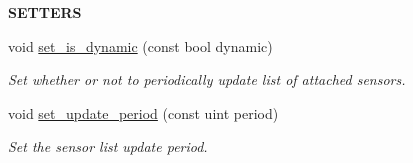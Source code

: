 \begin{Indent}{\bf S\+E\+T\+T\+E\+RS}\par
\begin{DoxyCompactItemize}
\item 
void \hyperlink{class_loom___multiplexer_ad0f1370584caf13e726c623dbbb250e1}{set\+\_\+is\+\_\+dynamic} (const bool dynamic)
\begin{DoxyCompactList}\small\item\em Set whether or not to periodically update list of attached sensors. \end{DoxyCompactList}\item 
void \hyperlink{class_loom___multiplexer_af2d5ac2ec43d7d9d8e809c26780d4421}{set\+\_\+update\+\_\+period} (const uint period)
\begin{DoxyCompactList}\small\item\em Set the sensor list update period. \end{DoxyCompactList}\end{DoxyCompactItemize}
\end{Indent}

